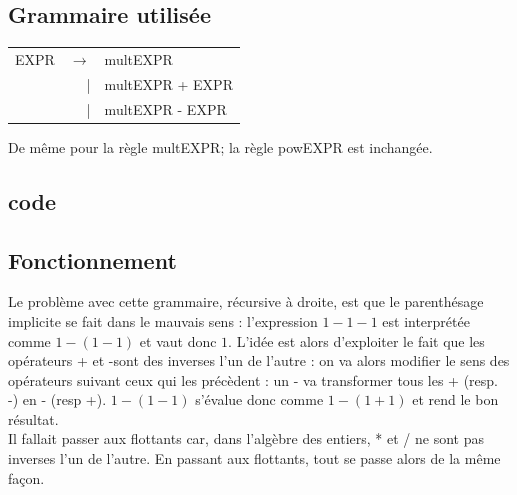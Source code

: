 \documentclass[11pt,a4paper]{article}
\begin{document}
\subsection{Grammaire utilisée}
 \begin{tabular}{lrl}
			EXPR & $\rightarrow$ & multEXPR \\ 
 					& | & multEXPR + EXPR \\
 					& | & multEXPR - EXPR \\
\end{tabular} 
De même pour la règle multEXPR; la règle powEXPR est inchangée.
		\subsection{code}\begin{scriptsize}
		\end{scriptsize}
		
		\subsection{Fonctionnement}		
			Le problème avec cette grammaire, récursive à droite, est que le parenthésage implicite se fait dans le mauvais sens : l'expression $1-1-1$ est interprétée comme $1-(1-1)$ et vaut donc $1$. L'idée est alors d'exploiter le fait que les opérateurs + et -sont des inverses l'un de l'autre : on va alors modifier le sens des opérateurs suivant ceux qui les précèdent : un - va transformer tous les + (resp. -) en - (resp +). $1-(1-1)$ s'évalue donc comme $1-(1+1)$ et rend le bon résultat.\\
Il fallait passer aux flottants car, dans l'algèbre des entiers, * et / ne sont pas inverses l'un de l'autre. En passant aux  flottants, tout se passe alors de la même façon.\\
\end{document}

